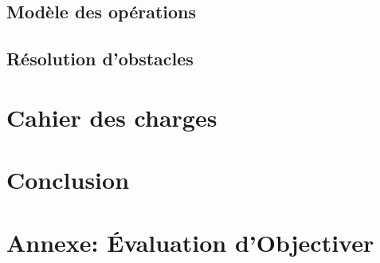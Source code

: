 \documentclass{report}
\begin{document}
	\section{Modèle des opérations}\label{section:operations}
		

	\section{Résolution d'obstacles}\label{section:obstacles}
		

\chapter{Cahier des charges}

\chapter*{Conclusion}
	

\chapter{Annexe: Évaluation d'Objectiver}
	
\end{document}
